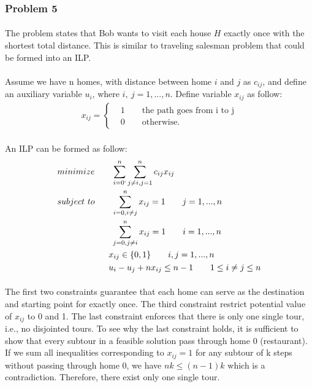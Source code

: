 \subsubsection*{Problem 5}
\paragraph{}
The problem states that Bob wants to visit each house $H$ exactly once with the shortest total distance. This is similar to traveling salesman problem that could be formed into an ILP.
\paragraph{}
Assume we have n homes, with distance between home $i$ and $j$ as $c_{ij}$, and define an auxiliary variable $u_i$, where $i,\ j=1,...,n$. Define variable $x_{ij}$ as follow:
\begin{align*}
x_{ij} = \begin{cases}
&1 \qquad \text{the path goes from i to j}\\
&0 \qquad \text{otherwise}.
\end{cases}
\end{align*}
\paragraph{}
An ILP can be formed as follow:
\begin{align*}
& minimize \quad \ \ \  \sum_{i=0`}^n\sum_{j\neq i, j=1}^n c_{ij}x_{ij}\\
& subject \ to \qquad \sum_{i=0, i\neq j}^n x_{ij} = 1 \qquad j=1,...,n\\
& \qquad \qquad \qquad \ \sum_{j=0, j\neq i}^n x_{ij} = 1 \qquad i=1,...,n\\
& \qquad \qquad \qquad x_{ij} \in \{0, 1\}  \qquad i, j = 1,...,n\\
& \qquad \qquad \qquad u_i - u_j +nx_{ij} \leq n-1 \qquad 1\leq i \neq j \leq n\\
\end{align*}
\vspace{-50pt}
\paragraph{}
The first two constraints guarantee that each home can serve as the destination and starting point for exactly once. The third constraint restrict potential value of $x_{ij}$ to 0 and 1. The last constraint enforces that there is only one single tour, i.e., no disjointed tours. To see why the last constraint holds, it is sufficient to show that every subtour in a feasible solution pass through home 0 (restaurant). If we sum all inequalities corresponding to $x_{ij} =1$ for any subtour of k steps without passing through home 0, we have $ nk \leq (n-1)k$ which is a contradiction. Therefore, there exist only one single tour.